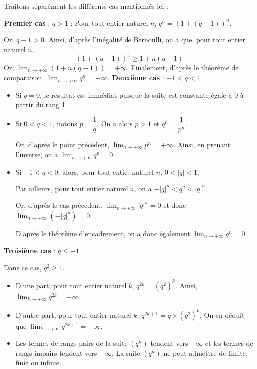 \documentclass[11pt,fleqn, openany]{book} %
\begin{document}
\begin{demonstration} Traitons séparément les différents cas mentionnés ici :

\textbf{Premier cas} : $q>1$ :
Pour tout entier naturel $n$, $q^n=(1+(q-1))^n$. 

Or, $q-1>0$. Ainsi, d'après l'inégalité de Bernoulli, on a que, pour tout entier naturel $n$, \[(1+(q-1))^n \geqslant 1+n(q-1)\] Or, $\displaystyle \lim_{n \to +\infty} (1+n(q-1)) = +\infty$. Finalement, d'après le théorème de comparaison, $\displaystyle \lim_{n \to +\infty} q^n = +\infty$.
\vskip10pt
\textbf{Deuxième cas} : $-1 < q < 1$
\begin{itemize}
\item Si $q=0$, le résultat est immédiat puisque la suite est constante égale à 0 à partir du rang 1.
\item Si $0<q<1$, notons $p=\dfrac{1}{q}$. On a alors $p>1$ et $q^n=\dfrac{1}{p^n}$. 

Or, d'après le point précédent, $\displaystyle \lim_{n \to +\infty} p^n = + \infty$. Ainsi, en prenant l'inverse, on a $\displaystyle \lim_{n \to +\infty} q^n = 0$
\item Si $-1<q<0$, alors, pour tout entier naturel $n$, $0<\lvert  q \rvert < 1$. 

Par ailleurs, pour tout entier naturel $n$, on a $-|q|^n < q^n < |q|^n$. 

Or, d'après le cas précédent, $\displaystyle \lim_{n \to +\infty} |q|^n=0$ et donc $\displaystyle \lim_{n \to +\infty} (-|q|^n)=0$. 

D'après le théorème d'encadrement, on a donc également $\displaystyle \lim_{n \to +\infty} q^n =0$.
\end{itemize}

\newpage

\textbf{Troisième cas} : $q \leqslant -1$

Dans ce cas, $q^2 \geqslant 1$.
\begin{itemize}
\item D'une part, pour tout entier naturel $k$, $q^{2k}=(q^2)^k$. Ainsi, $\displaystyle \lim_{k \to +\infty} q^{2k} = +\infty$.
\item D'autre part, pour tout entier naturel $k$, $q^{2k+1}=q\times (q^2)^k$. On en déduit que $\displaystyle \lim_{k \to +\infty} q^{2k+1} = -\infty$.
\item Les termes de rangs pairs de la suite $(q^n)$ tendent vers $+\infty$ et les termes de rangs impairs tendent vers $-\infty$. La suite $(q^n)$ ne peut admettre de limite, finie ou infinie.
\end{itemize}\end{demonstration}
\end{document}
